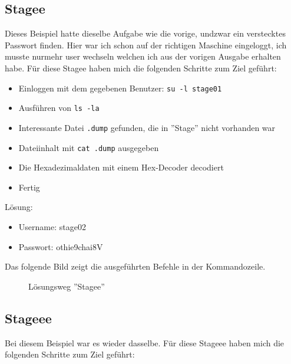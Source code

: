 \documentclass[12pt, a4paper, titlepage, oneside]{scrartcl}
\begin{document}
	\newpage

	\subsection{Stagee}
	Dieses Beispiel hatte dieselbe Aufgabe wie die vorige, undzwar ein verstecktes
	Passwort finden. Hier war ich schon auf der richtigen Maschine eingeloggt, ich
	musste nurmehr user wechseln welchen ich aus der vorigen Ausgabe erhalten habe.
	Für diese Stagee haben mich die folgenden Schritte zum Ziel geführt:

	\begin{itemize}
		\item Einloggen mit dem gegebenen Benutzer: \lstinline{su -l stage01}

		\item Ausführen von \lstinline{ls -la}

		\item Interessante Datei \lstinline{.dump} gefunden, die in ''Stage'' nicht vorhanden
			war

		\item Dateiinhalt mit \lstinline{cat .dump} ausgegeben

		\item Die Hexadezimaldaten mit einem Hex-Decoder decodiert

		\item Fertig
	\end{itemize}

	Lösung:
	\begin{itemize}
		\item Username: stage02

		\item Passwort: othie9chai8V
	\end{itemize}

	Das folgende Bild zeigt die ausgeführten Befehle in der Kommandozeile.
	\begin{figure}[h!]
		\centering
		\caption{Lösungsweg ''Stagee''}
		\label{fig:stagee_solution}
	\end{figure}

	\newpage

	\subsection{Stageee}
	Bei diesem Beispiel war es wieder dasselbe. Für diese Stageee haben mich die folgenden
	Schritte zum Ziel geführt:
\end{document}
